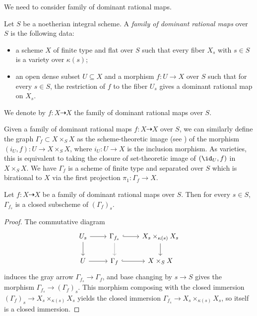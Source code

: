   We need to consider family of dominant rational maps.
  \begin{definition}
    Let $S$ be a noetherian integral scheme.
    A \emph{family of dominant rational maps} over $S$ is the following data:
    \begin{itemize}
      \item a scheme $X$ of finite type and flat over $S$ such that every fiber $X_s$ with $s \in S$ is a variety over $\kappa(s)$;
      \item an open dense subset $U \subseteq X$ and a morphism $f: U \to X$ over $S$ such that for every $s \in S$, the restriction of $f$ to the fiber $U_s$ gives a dominant rational map on $X_s$.
    \end{itemize}
    We denote by $f: X \dashrightarrow X$ the family of dominant rational maps over $S$.
  \end{definition}

  Given a family of dominant rational maps $f: X \dashrightarrow X$ over $S$, we can similarly define the graph $\Gamma_f \subset X \times_S X$ as the scheme-theoretic image (see \cite[Tag 01R5]{Stacks}) of the morphism $(i_U, f): U \to X \times_S X$, where $i_U: U \to X$ is the inclusion morphism.
  As varieties, this is equivalent to taking the closure of set-theoretic image of $(\id_U, f)$ in $X \times_S X$.
  We have $\Gamma_f$ is a scheme of finite type and separated over $S$ which is birational to $X$ via the first projection $\pi_1: \Gamma_f \to X$.

  \begin{proposition}
    Let $f: X \dashrightarrow X$ be a family of dominant rational maps over $S$.
    Then for every $s \in S$, $\Gamma_{f_s}$ is a closed subscheme of $(\Gamma_f)_s$.
  \end{proposition}
  \begin{proof}
    The commutative diagram 
    \[
      \begin{tikzcd}
        U_s \ar[r] \ar[d] & \Gamma_{f_s} \ar[r, hook] \ar[d,gray] & X_s \times_{\kappa(s)} X_s \ar[d] \\
        U \ar[r] & \Gamma_f \ar[r, hook] & X \times_S X
      \end{tikzcd}
    \]
    induces the gray arrow $\Gamma_{f_s} \to \Gamma_f$, and base changing by $s \to S$ gives the morphism $\Gamma_{f_s} \to (\Gamma_f)_s$.
    This morphism composing with the closed immersion $(\Gamma_f)_s \to X_s \times_{\kappa(s)} X_s$ yields the closed immersion $\Gamma_{f_s} \to X_s \times_{\kappa(s)} X_s$, so itself is a closed immersion.
  \end{proof}

